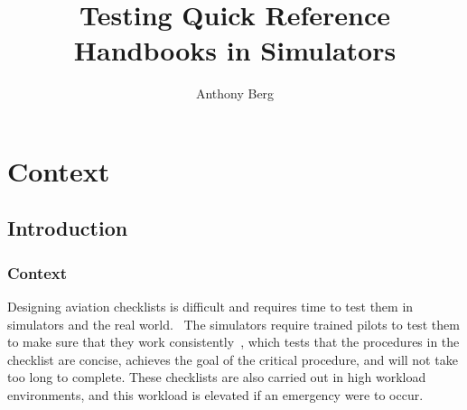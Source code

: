 \documentclass[a4paper, british]{article}
\author{Anthony Berg}
\title{Testing Quick Reference Handbooks in Simulators}
\newcommand{\lfcomment}[1]{\textcolor{blue}{\textbf{LF}:~#1}}
\renewcommand{\lfcomment}[1]{\relax}
\begin{document}
\begin{titlepage}
    \clearpage\maketitle 
    \thispagestyle{empty}
\end{titlepage}

\section{Context}
\subsection{Introduction}
\subsubsection*{Context}

Designing aviation checklists is difficult and requires time 
to test them in simulators and the real world.~\cite{nasa-design}
The simulators require trained pilots to test them to make 
sure that they work consistently~\cite{manifesto}, which tests 
that the procedures in the checklist are concise, achieves the goal
of the critical procedure, and will not take too long to complete.
These checklists are also carried out in high workload environments,
and this workload is elevated if an emergency were to occur.~\cite{caa-emergency}
\end{document}
